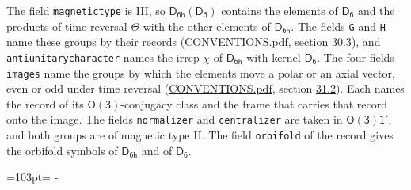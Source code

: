 \documentclass[10pt,a4paper]{article}
\newcommand{\needspace}[1]{\par\penalty-100\begingroup\dimen0=#1\relax\dimen2=\pagegoal
  \advance\dimen2-\pagetotal\ifdim\dimen0>\dimen2\relax\ifdim\dimen2>0pt\vfil\break\fi\fi
  \endgroup}
\numberwithin{equation}{section}
\newcommand{\grp}[1]{\mathsf{#1}}
\begin{document}
The field \texttt{magnetictype} is III, so $\grp{D_{6h}}(\grp{D_{6}})$ contains the elements of $\grp{D_{6}}$ and the products of time reversal $\varTheta$ with the other elements of $\grp{D_{6h}}$. The fields \texttt{G} and \texttt{H} name these groups by their records (\href{../../CONVENTIONS.pdf}{CONVENTIONS.pdf}, section \href{../../CONVENTIONS.pdf\#conv.30.3}{30.3}), and \texttt{antiunitarycharacter} names the irrep $\chi$ of $\grp{D_{6h}}$ with kernel $\grp{D_{6}}$. The four fields \texttt{images} name the groups by which the elements move a polar or an axial vector, even or odd under time reversal (\href{../../CONVENTIONS.pdf}{CONVENTIONS.pdf}, section \href{../../CONVENTIONS.pdf\#conv.31.2}{31.2}). Each names the record of its $\grp{O(3)}$-conjugacy class and the frame that carries that record onto the image. The fields \texttt{normalizer} and \texttt{centralizer} are taken in $\grp{O(3)1'}$, and both groups are of magnetic type II. The field \texttt{orbifold} of the record gives the orbifold symbols of $\grp{D_{6h}}$ and of $\grp{D_{6}}$.
\needspace{103pt}
\end{document}

